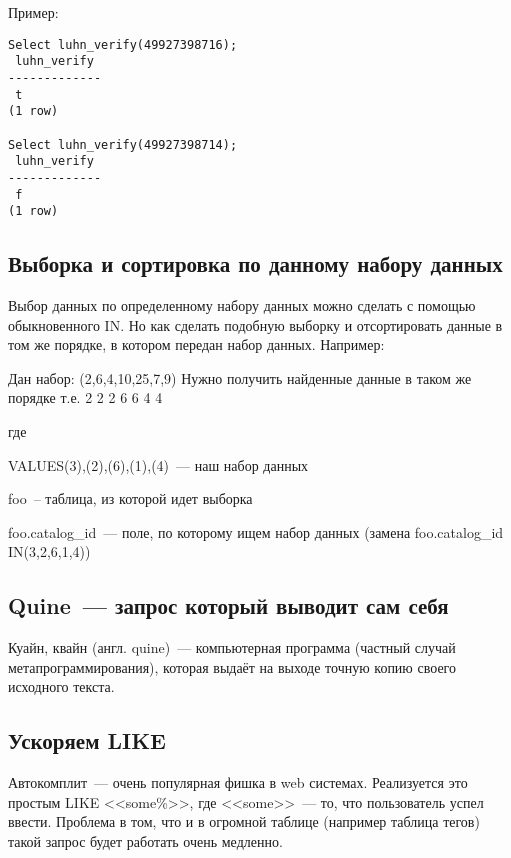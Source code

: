 

Пример:
\begin{lstlisting}[label=lst:snippets11,caption=Алгоритм Луна. Пример]
Select luhn_verify(49927398716);
 luhn_verify
-------------
 t
(1 row)

Select luhn_verify(49927398714);
 luhn_verify
-------------
 f
(1 row)

\end{lstlisting}

\subsection{Выборка и сортировка по данному набору данных}
Выбор данных по определенному набору данных можно сделать с помощью обыкновенного IN. Но как сделать подобную выборку и отсортировать
данные в том же порядке, в котором передан набор данных. Например:

Дан набор: (2,6,4,10,25,7,9)
Нужно получить найденные данные в таком же порядке т.е. 2 2 2 6 6 4 4



где

VALUES(3),(2),(6),(1),(4)~--- наш набор данных

foo~-- таблица, из которой идет выборка

foo.catalog\_id~--- поле, по которому ищем набор данных (замена foo.catalog\_id IN(3,2,6,1,4))

\subsection{Quine~--- запрос который выводит сам себя}
Куайн, квайн (англ. quine)~--- компьютерная программа (частный случай метапрограммирования),
которая выдаёт на выходе точную копию своего исходного текста.



\subsection{Ускоряем LIKE}
Автокомплит~--- очень популярная фишка в web системах. Реализуется это простым LIKE <<some\%>>,
где <<some>>~--- то, что пользователь успел ввести. Проблема в том, что и в огромной таблице
(например таблица тегов) такой запрос будет работать очень медленно.

